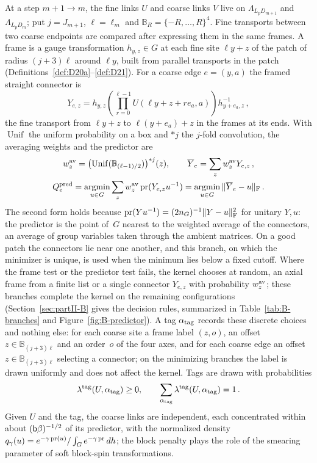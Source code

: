 At a step $m+1\to m$, the fine links $U$ and coarse links $V$ live on $\Lambda_{L_pD_{m+1}}$ and $\Lambda_{L_pD_m}$; put $j=J_{m+1}$, $\ell=\ell_m$ and $\mathbb B_R=\{-R,\ldots,R\}^4$. Fine transports between two coarse endpoints are compared after expressing them in the same frames. A frame is a gauge transformation $h_{y,z}\in G$ at each fine site $\ell y+z$ of the patch of radius $(j+3)\ell$ around $\ell y$, built from parallel transports in the patch (Definitions~\ref{def:D20a}--\ref{def:D21}). For a coarse edge $e=(y,a)$ the framed straight connector is
\begin{equation}\label{eq:I12-framed-connector}
Y_{e,z}=h_{y,z}\left(\prod_{r=0}^{\ell-1}U(\ell y+z+re_a,a)\right)h_{y+e_a,z}^{-1}\,,
\end{equation}
the fine transport from $\ell y+z$ to $\ell(y+e_a)+z$ in the frames at its ends. With $\operatorname{Unif}$ the uniform probability on a box and $*j$ the $j$-fold convolution, the averaging weights and the predictor are
\begin{equation}\label{eq:I12-predictor}
\begin{gathered}
w_z^{\rm av}=\bigl(\operatorname{Unif}(\mathbb B_{(\ell-1)/2})\bigr)^{*j}(z),\qquad \overline Y_e=\sum_zw_z^{\rm av}Y_{e,z}\,,\\
Q_e^{\rm pred}=\operatorname*{argmin}_{u\in G}\sum_z w_z^{\rm av}\operatorname{pr}(Y_{e,z}u^{-1})=\operatorname*{argmin}_{u\in G}\|\overline Y_e-u\|_{\rm F}\,.
\end{gathered}
\end{equation}
The second form holds because $\operatorname{pr}(Yu^{-1})=(2n_G)^{-1}\|Y-u\|_{\rm F}^2$ for unitary $Y,u$: the predictor is the point of~$G$ nearest to the weighted average of the connectors, an average of group variables taken through the ambient matrices. On a good patch the connectors lie near one another, and this branch, on which the minimizer is unique, is used when the minimum lies below a fixed cutoff. Where the frame test or the predictor test fails, the kernel chooses at random, an axial frame from a finite list or a single connector $Y_{e,z}$ with probability $w^{\rm av}_z$; these branches complete the kernel on the remaining configurations (Section~\ref{sec:partII-B} gives the decision rules, summarized in Table~\ref{tab:B-branches} and Figure~\ref{fig:B-predictor}). A tag $\alpha_{\rm tag}$ records these discrete choices and nothing else: for each coarse site a frame label $(z,o)$, an offset $z\in\mathbb B_{(j+3)\ell}$ and an order~$o$ of the four axes, and for each coarse edge an offset $z\in\mathbb B_{(j+3)\ell}$ selecting a connector; on the minimizing branches the label is drawn uniformly and does not affect the kernel. Tags are drawn with probabilities
\begin{equation}\label{eq:I12-tag-mass}
\lambda^{\rm tag}(U,\alpha_{\rm tag})\ge0,\qquad
\sum_{\alpha_{\rm tag}}\lambda^{\rm tag}(U,\alpha_{\rm tag})=1\,.
\end{equation}
Given $U$ and the tag, the coarse links are independent, each concentrated within about $(\mathsf{b}\beta)^{-1/2}$ of its predictor, with the normalized density $q_\gamma(u)=e^{-\gamma\operatorname{pr}(u)}/\int_Ge^{-\gamma\operatorname{pr}}\,dh$; the block penalty plays the role of the smearing parameter of soft block-spin transformations.

